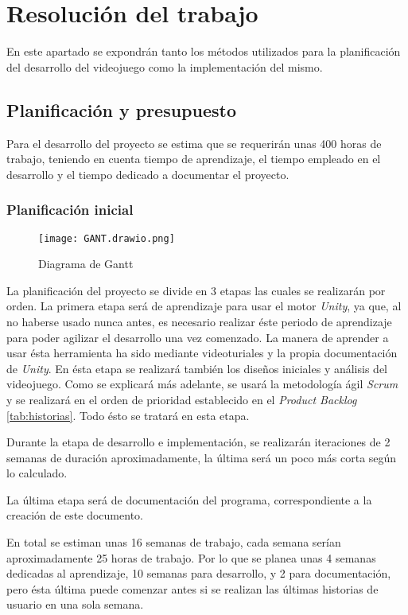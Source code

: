 \chapter{Resolución del trabajo}
\label{chap:resolucion}

En este apartado se expondrán tanto los métodos utilizados para la planificación del 
desarrollo del videojuego como la implementación del mismo.  

\section{Planificación y presupuesto}
\label{sec:planificacion}
Para el desarrollo del proyecto se estima que se requerirán  unas 400 horas de trabajo, teniendo en cuenta tiempo de aprendizaje, el tiempo empleado en el desarrollo y el tiempo dedicado a documentar el proyecto.

\subsection{Planificación inicial}

\begin{figure}[H]
    \centering
    \texttt{[image: GANT.drawio.png]}
    \caption{Diagrama de Gantt}
\end{figure}

La planificación del proyecto se divide en 3 etapas las cuales se realizarán por orden. La primera etapa será de aprendizaje para usar el motor \textit{Unity}, ya que, al no haberse usado nunca antes, es necesario realizar éste periodo de aprendizaje para poder agilizar el desarrollo una vez comenzado. La manera de aprender a usar ésta herramienta ha sido mediante videoturiales y la propia documentación de \textit{Unity}. En ésta etapa se realizará también los diseños iniciales y análisis del videojuego. Como se explicará más adelante, se usará la metodología ágil \textit{Scrum} y se realizará en el orden de prioridad establecido en el \textit{Product Backlog} \ref{tab:historias}. Todo ésto se tratará en esta etapa.

Durante la etapa de desarrollo e implementación, se realizarán iteraciones de 2 semanas de duración aproximadamente, la última será un poco más corta según lo calculado. 

La última etapa será de documentación del programa, correspondiente a la creación de este documento.

En total se estiman unas 16 semanas de trabajo, cada semana serían aproximadamente 25 horas de trabajo. Por lo que se planea unas 4 semanas dedicadas al aprendizaje, 10 semanas para desarrollo, y 2 para documentación, pero ésta última puede comenzar antes si se realizan las últimas historias de usuario en una sola semana.

